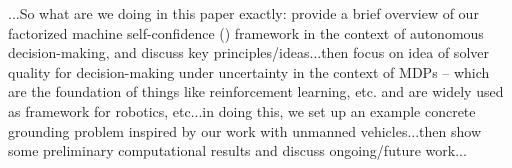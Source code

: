 ...So what are we doing in this paper exactly: provide a brief overview of our factorized machine self-confidence (\famsec) framework in the context of autonomous decision-making, and discuss key principles/ideas...then focus on idea of solver quality for decision-making under uncertainty in the context of MDPs -- which are the foundation of things like reinforcement learning, etc. and are widely used as framework for robotics, etc...in doing this, we set up an example concrete grounding problem inspired by our work with unmanned vehicles...then show some preliminary computational results and discuss ongoing/future work...


